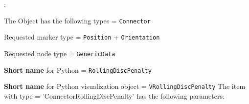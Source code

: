\noindent {}:
\bi
  \item The Object has the following types = \texttt{Connector}
  \item Requested marker type = \texttt{Position} + \texttt{Orientation}
  \item Requested node type = \texttt{GenericData}
  \item {\bf Short name} for Python = \texttt{RollingDiscPenalty}
  \item {\bf Short name} for Python visualization object = \texttt{VRollingDiscPenalty}
\ei\vspace{12pt} \noindent 
The item  with type = 'ConnectorRollingDiscPenalty' has the following parameters:
\vspace{-0.5cm}\\
\vspace{-0.5cm}\\

